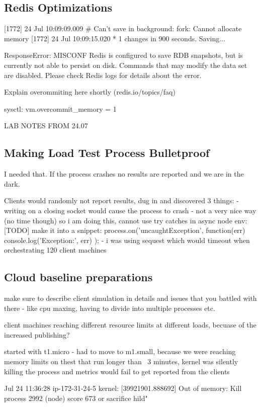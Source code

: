 \documentclass{uvamscse}
\begin{document}
\subsection{Redis Optimizations}
[1772] 24 Jul 10:09:09.009 \# Can't save in background: fork: Cannot allocate memory
[1772] 24 Jul 10:09:15.020 * 1 changes in 900 seconds. Saving...

ResponseError: MISCONF Redis is configured to save RDB snapshots, but is currently not able to persist on disk. Commands that may modify the data set are disabled. Please check Redis logs for details about the error.

Explain overommiting here shortly (redis.io/topics/faq)

sysctl: vm.overcommit\_memory = 1

LAB NOTES FROM 24.07

\subsection{Making Load Test Process Bulletproof}
I needed that. If the process crashes no results are reported and we are in the dark.

Clients would randomly not report results, dug in and discovered 3 things:
  - writing on a closing socket would cause the process to crash
  - not a very nice way (no time though) so i am doing this, cannot use try {}catches in async node env:
  [TODO] make it into a snippet:
  process.on('uncaughtException', function(err) {
    console.log('Exception:', err)
});
  - i was using sequest which would timeout when orchestrating 120 client machines

\subsection{Cloud baseline preparations}

make sure to describe client simulation in details and issues that you battled with there - like cpu maxing, having to divide into multiple processes etc.

client machines reaching different resource limits at different loads, becuase of the increased publishing?

started with t1.micro - had to move to m1.small, because we were reaching memory limits on thest that run longer than ~3 minutes, kernel was silently killing the process and metrics would fail to get reported from the clients

Jul 24 11:36:28 ip-172-31-24-5 kernel: [39921901.888692] Out of memory: Kill process 2992 (node) score 673 or sacrifice hild"
\end{document}
